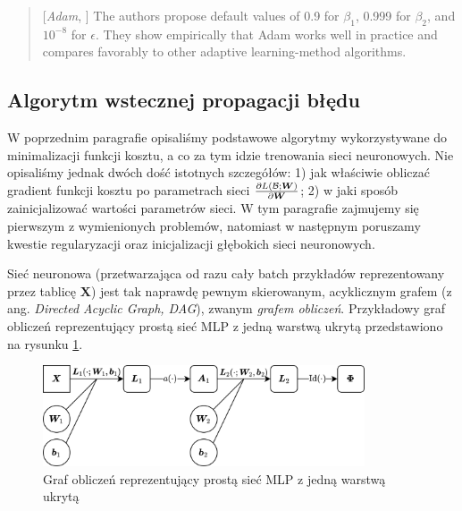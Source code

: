 \documentclass{myclass}
\numberwithin{equation}{subsection}
\begin{document}
\begin{quote}[\textit{Adam}, \cite{ruder2017overviewgradientdescentoptimization}]
The authors propose default values of 0.9 for \(\beta_1\), 0.999 for \(\beta_2\), and \(10^{-8}\)
for \(\epsilon\). They show empirically that Adam works well in practice and compares favorably to
other adaptive learning-method algorithms.
\end{quote}


\subsection{Algorytm wstecznej propagacji błędu}

W poprzednim paragrafie opisaliśmy podstawowe algorytmy wykorzystywane do minimalizacji funkcji
kosztu, a co za tym idzie trenowania sieci neuronowych. Nie opisaliśmy jednak dwóch dość istotnych
szczegółów: 1) jak właściwie obliczać gradient funkcji kosztu po parametrach sieci \(\pdv{L(\mathcal{B};
\bm{W})}{\bm{W}}\); 2) w jaki sposób zainicjalizować wartości parametrów sieci. W tym paragrafie
zajmujemy się pierwszym z wymienionych problemów, natomiast w następnym poruszamy kwestie
regularyzacji oraz inicjalizacji głębokich sieci neuronowych.

Sieć neuronowa (przetwarzająca od razu cały batch przykładów reprezentowany przez tablicę
\(\bm{X}\)) jest tak naprawdę pewnym skierowanym, acyklicznym grafem (z ang. \textit{Directed
Acyclic Graph, DAG}), zwanym \emph{grafem obliczeń}. Przykładowy graf obliczeń reprezentujący prostą
sieć MLP z jedną warstwą ukrytą przedstawiono na rysunku \ref{fig:compgraph}.

\begin{figure}[ht]
\centering
\includegraphics[width=0.85\textwidth]{figs/compgraph.png}
\caption{Graf obliczeń reprezentujący prostą sieć MLP z jedną warstwą ukrytą}
\label{fig:compgraph}
\end{figure}
\end{document}
